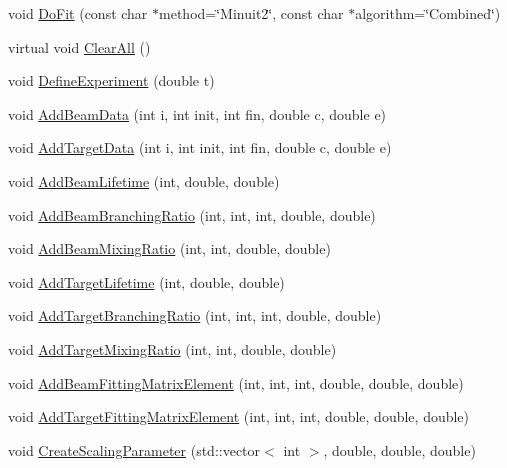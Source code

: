 \begin{DoxyCompactItemize}
\item 
void \hyperlink{classCoulExSimFitter_ad5cfafc630353728fc475dee4f416e3e}{Do\-Fit} (const char $\ast$method=\char`\"{}Minuit2\char`\"{}, const char $\ast$algorithm=\char`\"{}Combined\char`\"{})
\item 
virtual void \hyperlink{classCoulExSimFitter_a336cebbb05f665e879cf945288cd4a92}{Clear\-All} ()
\item 
void \hyperlink{classCoulExSimFitter_ab76717d256f884ad458cc64a9c4cbbd6}{Define\-Experiment} (double t)
\item 
void \hyperlink{classCoulExSimFitter_abd66fba489f3f3eafd70b729f2a56d2a}{Add\-Beam\-Data} (int i, int init, int fin, double c, double e)
\item 
void \hyperlink{classCoulExSimFitter_abdfaf0502ad8be70258a652704e8353a}{Add\-Target\-Data} (int i, int init, int fin, double c, double e)
\item 
void \hyperlink{classCoulExSimFitter_a49e980169ce03a95e003ee789a7a093f}{Add\-Beam\-Lifetime} (int, double, double)
\item 
void \hyperlink{classCoulExSimFitter_a6a34bc77405a8c544b4631d89e341bc7}{Add\-Beam\-Branching\-Ratio} (int, int, int, double, double)
\item 
void \hyperlink{classCoulExSimFitter_a6898c4b40c84c2550c715a8e5ffb7e24}{Add\-Beam\-Mixing\-Ratio} (int, int, double, double)
\item 
void \hyperlink{classCoulExSimFitter_a5bc5460b494e5192955ca4e17f7e737e}{Add\-Target\-Lifetime} (int, double, double)
\item 
void \hyperlink{classCoulExSimFitter_ad7da9aa7feb7b6e84b553e29bb70edfb}{Add\-Target\-Branching\-Ratio} (int, int, int, double, double)
\item 
void \hyperlink{classCoulExSimFitter_a06812af2e0f8d29cd37b9a2c48239d5c}{Add\-Target\-Mixing\-Ratio} (int, int, double, double)
\item 
void \hyperlink{classCoulExSimFitter_ae9617c526ced92e93aa33e8e849f8221}{Add\-Beam\-Fitting\-Matrix\-Element} (int, int, int, double, double, double)
\item 
void \hyperlink{classCoulExSimFitter_aaad08ace7ff19a3d647ba876ca6ff08c}{Add\-Target\-Fitting\-Matrix\-Element} (int, int, int, double, double, double)
\item 
void \hyperlink{classCoulExSimFitter_a06aa31eb9c4dc51a2c69188373bf292d}{Create\-Scaling\-Parameter} (std\-::vector$<$ int $>$, double, double, double)
\item 

\end{DoxyCompactItemize}
